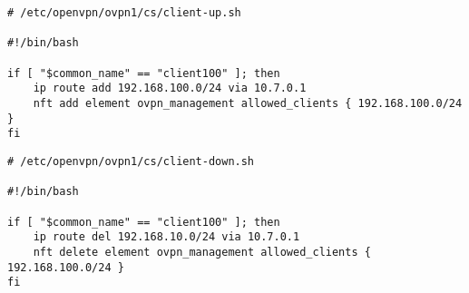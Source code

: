\begin{verbatim}
# /etc/openvpn/ovpn1/cs/client-up.sh

#!/bin/bash

if [ "$common_name" == "client100" ]; then
	ip route add 192.168.100.0/24 via 10.7.0.1
	nft add element ovpn_management allowed_clients { 192.168.100.0/24 }
fi	
\end{verbatim}

\begin{verbatim}
# /etc/openvpn/ovpn1/cs/client-down.sh
	
#!/bin/bash
	
if [ "$common_name" == "client100" ]; then
	ip route del 192.168.10.0/24 via 10.7.0.1
	nft delete element ovpn_management allowed_clients { 192.168.100.0/24 }
fi	
\end{verbatim}

		
		
		
